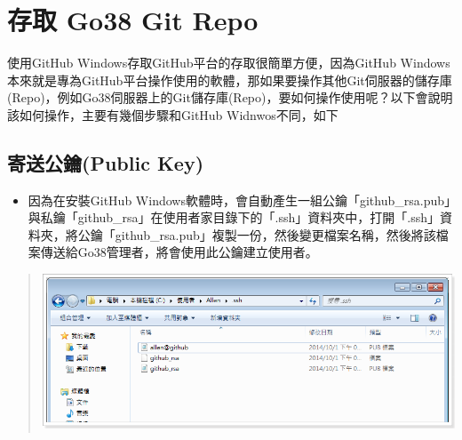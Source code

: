 \documentclass[letterpaper,10pt,english]{sphinxmanual}
\begin{document}
\section{存取 Go38 Git Repo}
\label{_doc/writing/index-github:go38-git-repo}
使用GitHub Windows存取GitHub平台的存取很簡單方便，因為GitHub Windows本來就是專為GitHub平台操作使用的軟體，那如果要操作其他Git伺服器的儲存庫(Repo)，例如Go38伺服器上的Git儲存庫(Repo)，要如何操作使用呢？以下會說明該如何操作，主要有幾個步驟和GitHub Widnwos不同，如下


\subsection{寄送公鑰(Public Key)}
\label{_doc/writing/index-github:public-key}\begin{itemize}
\item {} 
因為在安裝GitHub Windows軟體時，會自動產生一組公鑰「github\_rsa.pub」與私鑰「github\_rsa」在使用者家目錄下的「.ssh」資料夾中，打開「.ssh」資料夾，將公鑰「github\_rsa.pub」複製一份，然後變更檔案名稱，然後將該檔案傳送給Go38管理者，將會使用此公鑰建立使用者。

\end{itemize}
\begin{quote}

\includegraphics{GitHub-sshkey.png}
\end{quote}
\end{document}

